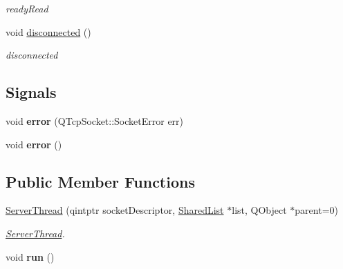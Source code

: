 \begin{DoxyCompactItemize}
\begin{DoxyCompactList}\small\item\em ready\-Read \end{DoxyCompactList}\item 
\hypertarget{classPenguinServer_1_1ServerThread_ab8cf109db69f19384009aa826a35a0d8}{void \hyperlink{classPenguinServer_1_1ServerThread_ab8cf109db69f19384009aa826a35a0d8}{disconnected} ()}\label{classPenguinServer_1_1ServerThread_ab8cf109db69f19384009aa826a35a0d8}

\begin{DoxyCompactList}\small\item\em disconnected \end{DoxyCompactList}\end{DoxyCompactItemize}
\subsection*{Signals}
\begin{DoxyCompactItemize}
\item 
\hypertarget{classPenguinServer_1_1ServerThread_a58b8482b6549f66c8f505dbc220579c5}{void {\bfseries error} (Q\-Tcp\-Socket\-::\-Socket\-Error err)}\label{classPenguinServer_1_1ServerThread_a58b8482b6549f66c8f505dbc220579c5}

\item 
\hypertarget{classPenguinServer_1_1ServerThread_ab0224bcf7968eadb0de910743935bec0}{void {\bfseries error} ()}\label{classPenguinServer_1_1ServerThread_ab0224bcf7968eadb0de910743935bec0}

\end{DoxyCompactItemize}
\subsection*{Public Member Functions}
\begin{DoxyCompactItemize}
\item 
\hyperlink{classPenguinServer_1_1ServerThread_a6cab741c43bc6d0794b019115d7a1b51}{Server\-Thread} (qintptr socket\-Descriptor, \hyperlink{classPenguinServer_1_1SharedList}{Shared\-List} $\ast$list, Q\-Object $\ast$parent=0)
\begin{DoxyCompactList}\small\item\em \hyperlink{classPenguinServer_1_1ServerThread}{Server\-Thread}. \end{DoxyCompactList}\item 
\hypertarget{classPenguinServer_1_1ServerThread_aaa5ec990ecfab27ee20f24e4c4992c6e}{void {\bfseries run} ()}\label{classPenguinServer_1_1ServerThread_aaa5ec990ecfab27ee20f24e4c4992c6e}

\end{DoxyCompactItemize}


